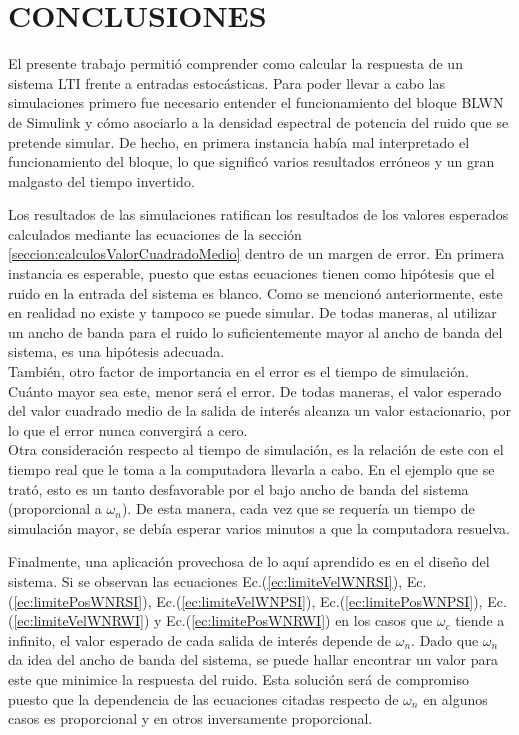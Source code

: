 \documentclass[a4paper,11pt,twoside]{IT-CNEA}
\begin{document}
\section{CONCLUSIONES}
El presente trabajo permitió comprender como calcular la respuesta de un sistema LTI frente a entradas estocásticas. Para poder llevar a cabo las simulaciones primero fue necesario entender el funcionamiento del bloque BLWN de Simulink y cómo asociarlo a la densidad espectral de potencia del ruido que se pretende simular. De hecho, en primera instancia había mal interpretado el funcionamiento del bloque, lo que significó varios resultados erróneos y un gran malgasto del tiempo invertido.  
\par Los resultados de las simulaciones ratifican los resultados de los valores esperados calculados mediante las ecuaciones de la sección \ref{seccion:calculosValorCuadradoMedio} dentro de un margen de error. En primera instancia es esperable, puesto que estas ecuaciones tienen como hipótesis que el ruido en la entrada del sistema es blanco. Como se mencionó anteriormente, este en realidad no existe y tampoco se puede simular. De todas maneras, al utilizar un ancho de banda para el ruido lo suficientemente mayor al ancho de banda del sistema, es una hipótesis adecuada.
\\ También, otro factor de importancia en el error es el tiempo de simulación. Cuánto mayor sea este, menor será el error. De todas maneras, el valor esperado del valor cuadrado medio de la salida de interés alcanza un valor estacionario, por lo que el error nunca convergirá a cero. 
\\Otra consideración respecto al tiempo de simulación, es la relación de este con el tiempo real que le toma a la computadora llevarla a cabo. En el ejemplo que se trató, esto es un tanto desfavorable por el bajo ancho de banda del sistema (proporcional a $\omega_n$). De esta manera, cada vez que se requería un tiempo de simulación mayor, se debía esperar varios minutos a que la computadora resuelva. 
\par Finalmente, una aplicación provechosa de lo aquí aprendido es en el diseño del sistema. Si se observan las ecuaciones Ec.(\ref{ec:limiteVelWNRSI}), Ec.(\ref{ec:limitePosWNRSI}), Ec.(\ref{ec:limiteVelWNPSI}), Ec.(\ref{ec:limitePosWNPSI}), Ec.(\ref{ec:limiteVelWNRWI}) y Ec.(\ref{ec:limitePosWNRWI}) en los casos que $\omega_c$ tiende a infinito, el valor esperado de cada salida de interés depende de $\omega_n$. Dado  que $\omega_n$ da idea del ancho de banda del sistema, se puede hallar encontrar un valor para este que minimice la respuesta del ruido. Esta solución será de compromiso puesto que la dependencia de las ecuaciones citadas respecto de $\omega_n$ en algunos casos es proporcional y en otros inversamente proporcional. 
\newpage


\end{document}
